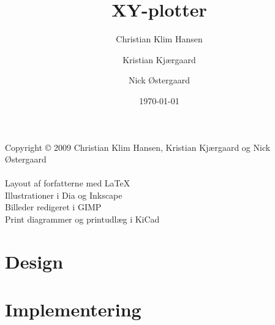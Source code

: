 \documentclass{mypaper}
\title{XY-plotter}
\author{Christian Klim Hansen \and Kristian Kjærgaard \and Nick Østergaard}
\date{\today}
\begin{document}


\setcounter{page}{2}

\strut \vfill { \footnotesize
  \noindent 
  Copyright © 2009 Christian Klim Hansen, Kristian Kjærgaard og Nick Østergaard\\\\
  \noindent
  Layout af forfatterne med \LaTeX\\
  Illustrationer i Dia og Inkscape\\
  Billeder redigeret i GIMP\\
  Print diagrammer og printudlæg i KiCad
}

\thispagestyle{empty}

\clearpage

\frontmatter

\tableofcontents



\mainmatter




\part{Design}
\label{prt:design}





\part{Implementering}
\label{prt:implementering}





\backmatter



\nocite{*}


\label{ch:litteratur}

\listoffigures

\listoftables

\listoffixmes
\end{document}
